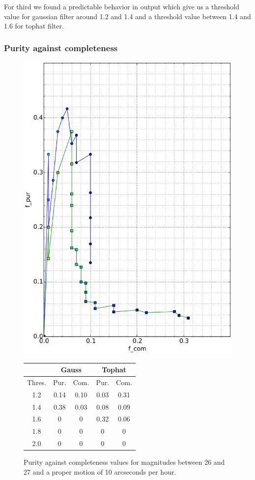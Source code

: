 \documentclass{article}
\begin{document}
For third we found a predictable behavior in output which give us a threshold value for gaussian filter around 1.2 and 1.4 and a threshold value between 1.4 and 1.6 for tophat filter.  

\subsubsection{Purity against completeness}
\begin{figure}[H]
\centering
\includegraphics[width=.55\linewidth]{images/26_27_10_f.eps}
\qquad
\begin{tabular}[b]{|c|c|c|c|c|}\hline
\multicolumn{1}{|c|}{} & \multicolumn{2}{c|}{Gauss} & \multicolumn{2}{c|}{Tophat} \\
\hline \hline
Thres. & Pur. & Com. & Pur. & Com.\\
\hline
1.2 & 0.14 & 0.10 & 0.03 & 0.31\\
\hline
1.4 & 0.38 & 0.03 & 0.08 & 0.09\\
\hline
1.6 & 0 & 0 & 0.32 & 0.06\\
\hline
1.8 & 0 & 0 & 0 & 0\\
\hline
2.0 & 0 & 0 & 0 & 0\\
\hline
\end{tabular}
\captionsetup{labelformat=andtable}
\caption{Purity against completeness values for magnitudes between 26 and 27 and a proper motion of 10 arcseconds per hour.}
\end{figure}
\end{document}
